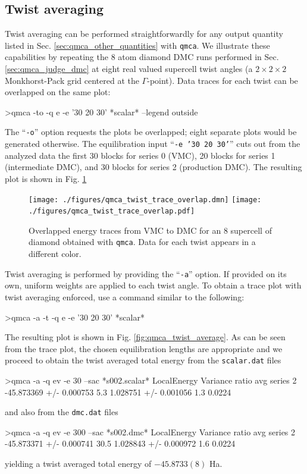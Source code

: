 \subsection{Twist averaging}
\label{sec:qmca_twist_average}
Twist averaging can be performed straightforwardly for any 
output quantity listed in Sec. \ref{sec:qmca_other_quantities} 
with \texttt{qmca}.  We illustrate these capabilities by 
repeating the 8 atom diamond DMC runs performed in Sec. 
\ref{sec:qmca_judge_dmc} at eight real valued supercell twist 
angles (a $2\times 2\times 2$ Monkhorst-Pack grid centered at 
the $\Gamma$-point).  Data traces for each twist can be overlapped 
on the same plot:
\begin{shade}
>qmca -to -q e -e '30 20 30' *scalar* --legend outside
\end{shade}
\noindent
The ``\texttt{-o}'' option requests the plots be overlapped; 
eight separate plots would be generated otherwise.  The 
equilibration input ``\texttt{-e '30 20 30'}'' cuts out from 
the analyzed data the first 30 blocks for series 0 (VMC), 
20 blocks for series 1 (intermediate DMC), and 30 blocks for 
series 2 (production DMC).  The resulting plot is shown in 
Fig. \ref{fig:qmca_twist_overlap}

\begin{figure}
\begin{center}
\ifdefined\HCode
\texttt{[image: ./figures/qmca\_twist\_trace\_overlap.dmn]}
\else
\texttt{[image: ./figures/qmca\_twist\_trace\_overlap.pdf]}
\fi
\end{center}
\caption{Overlapped energy traces from VMC to DMC for an 8 supercell of diamond obtained with \texttt{qmca}.  Data for each twist appears in a different color.}
\label{fig:qmca_twist_overlap}
\end{figure}

Twist averaging is performed by providing the ``\texttt{-a}'' 
option.  If provided on its own, uniform weights are applied 
to each twist angle.  To obtain a trace plot with twist averaging 
enforced, use a command similar to the following:
\begin{shade}
>qmca -a -t -q e -e '30 20 30' *scalar*
\end{shade}
\noindent
The resulting plot is shown in Fig. \ref{fig:qmca_twist_average}.
As can be seen from the trace plot, the chosen equilibration lengths 
are appropriate and we proceed to obtain the twist averaged total energy
from the \texttt{scalar.dat} files
\begin{shade}
>qmca -a -q ev -e 30 --sac *s002.scalar*
                            LocalEnergy               Variance           ratio 
avg  series 2  -45.873369 +/- 0.000753    5.3   1.028751 +/- 0.001056    1.3   0.0224 
\end{shade}
\noindent
and also from the \texttt{dmc.dat} files
\begin{shade}
>qmca -a -q ev -e 300 --sac *s002.dmc*
                            LocalEnergy               Variance           ratio 
avg  series 2  -45.873371 +/- 0.000741   30.5   1.028843 +/- 0.000972    1.6   0.0224 
\end{shade}
\noindent
yielding a twist averaged total energy of $-45.8733(8)$ Ha. 

